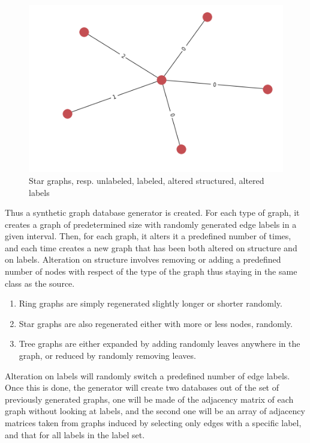 \documentclass{article}
\theoremstyle{definition}
\begin{document}
\begin{figure}[!htb]
\begin{multicols}{4}
		\includegraphics[width=\linewidth]{data/generated-graphs/star_altered_labels.png}\par
	\end{multicols}
	\caption{Star graphs, resp. unlabeled, labeled, altered structured, altered labels}
\end{figure}
Thus a synthetic graph database generator is created. For each type of graph, it creates a graph of predetermined size with randomly generated edge labels in a given interval. Then, for each graph, it alters it a predefined number of times, and each time creates a new graph that has been both altered on structure and on labels. Alteration on structure involves removing or adding a predefined number of nodes with respect of the type of the graph thus staying in the same class as the source. 
\begin{enumerate}
	\item Ring graphs are simply regenerated slightly longer or shorter randomly.
	\item Star graphs are also regenerated either with more or less nodes, randomly.
	\item Tree graphs are either expanded by adding randomly leaves anywhere in the graph, or reduced by randomly removing leaves.
\end{enumerate}
Alteration on labels will randomly switch a predefined number of edge labels. Once this is done, the generator will create two databases out of the set of previously generated graphs, one will be made of the adjacency matrix of each graph without looking at labels, and the second one will be an array of adjacency matrices taken from graphs induced by selecting only edges with a specific label, and that for all labels in the label set.
\end{document}
